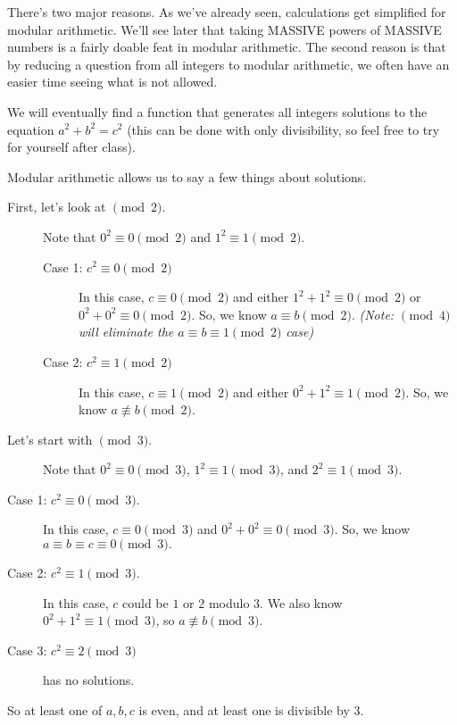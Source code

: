\documentclass[letterpaper, 11 pt]{ximera}
\begin{document}
There's two major reasons. As we've already seen, calculations get simplified for modular arithmetic. We'll see later that taking MASSIVE powers of MASSIVE numbers is a fairly doable feat in modular arithmetic. The second reason is that by reducing a question from all integers to modular arithmetic, we often have an easier time seeing what is not allowed. 

\begin{example}
 We will eventually find a function that generates all integers solutions to the equation $a^2+b^2=c^2$ (this can be done with only divisibility, so feel free to try for yourself after class).
 
 Modular arithmetic allows us to say a few things about solutions. 
 \begin{description}
 \item[First, let's look at $\!\pmod 2$.] Note that $0^2\equiv 0 \pmod 2$ and $1^2\equiv 1 \pmod 2$.

\begin{description}
 \item[Case 1: $c^2\equiv 0 \pmod 2$] In this case, $c\equiv 0\pmod 2$ and either $1^2+1^2\equiv 0\pmod 2$ or $0^2+0^2\equiv 0\pmod 2$. So, we know $a\equiv b\pmod 2.$ \emph{(Note: $\!\pmod 4$ will eliminate the $a\equiv b\equiv 1 \pmod 2$ case)}
  \item[Case 2: $c^2\equiv 1 \pmod 2$] In this case, $c\equiv 1\pmod 2$ and either $0^2+1^2\equiv 1\pmod 2$. So, we know $a\not\equiv b\pmod 2.$
\end{description}

\item[Let's start with $\!\pmod 3$.] Note that $0^2\equiv 0 \pmod 3$, $1^2\equiv 1 \pmod 3$, and $2^2\equiv 1 \pmod 3$.
\end{description} 

\begin{description}
 \item[Case 1: $c^2\equiv 0 \pmod 3$.] In this case, $c\equiv 0\pmod 3$ and $0^2+0^2\equiv 0\pmod 3$. So, we know $a\equiv b\equiv c\equiv 0\pmod 3.$ 
  \item[Case 2: $c^2\equiv 1 \pmod 3$.] In this case, $c$ could be $1$ or $2$ modulo $3$. We also know $0^2+1^2\equiv 1\pmod 3$, so  $a\not\equiv b\pmod 3.$
  \item[Case 3: $c^2\equiv 2 \pmod 3$] has no solutions.
\end{description}

So at least one of $a,b,c$ is even, and at least one is divisible by $3$.
\end{example}
\end{document}
